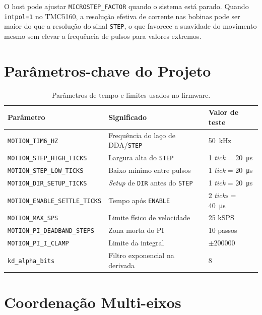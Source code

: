 O host pode ajustar \texttt{MICROSTEP\_FACTOR} quando o sistema est\'a
parado. Quando \texttt{intpol=1} no TMC5160, a resolu\c{c}\~ao efetiva de
corrente nas bobinas pode ser maior do que a resolu\c{c}\~ao do sinal
\texttt{STEP}, o que favorece a suavidade do movimento mesmo sem elevar a
frequ\^encia de pulsos para valores extremos.

\section{Par\^ametros-chave do Projeto}
\label{sec:parametros_projeto}

\begin{table}[H]
    \centering
    \caption{Par\^ametros de tempo e limites usados no firmware.}
    \label{tab:parametros-firmware}
    \setlength{\tabcolsep}{4pt}\footnotesize
    \begin{tabularx}{\textwidth}{lXl}
        \toprule
        Par\^ametro & Significado & Valor de teste \\
        \midrule
        \texttt{MOTION\_TIM6\_HZ} & Frequ\^encia do la\c{c}o de DDA/\texttt{STEP} & \SI{50}{\kilo\hertz} \\
        \texttt{MOTION\_STEP\_HIGH\_TICKS} & Largura alta do \texttt{STEP} & 1 \emph{tick} = \SI{20}{\micro\second} \\
        \texttt{MOTION\_STEP\_LOW\_TICKS} & Baixo m\'inimo entre pulsos & 1 \emph{tick} = \SI{20}{\micro\second} \\
        \texttt{MOTION\_DIR\_SETUP\_TICKS} & \emph{Setup} de \texttt{DIR} antes do \texttt{STEP} & 1 \emph{tick} = \SI{20}{\micro\second} \\
        \texttt{MOTION\_ENABLE\_SETTLE\_TICKS} & Tempo ap\'os \texttt{ENABLE} & 2 \emph{ticks} = \SI{40}{\micro\second} \\
        \texttt{MOTION\_MAX\_SPS} & Limite f\'isico de velocidade & 25 kSPS \\
        \texttt{MOTION\_PI\_DEADBAND\_STEPS} & Zona morta do PI & 10 passos \\
        \texttt{MOTION\_PI\_I\_CLAMP} & Limite da integral & $\pm 200000$ \\
        \texttt{kd\_alpha\_bits} & Filtro exponencial na derivada & 8 \\
        \bottomrule
    \end{tabularx}
\end{table}

\section{Coordena\c{c}\~ao Multi-eixos}
\label{sec:coordenacao_multi_eixos}

